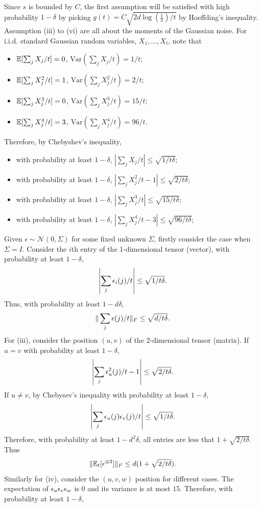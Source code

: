 Since $s$ is bounded by $C$, the first assumption will be satisfied with high probability $1-\delta$ by picking $g(t) = C\sqrt{2d\log(\frac{1}{\delta})/t}$ by Hoeffding's inequality. Assumption (iii) to (vi) are all about the moments of the Gaussian noise. 
For i.i.d. standard Gaussian random variables, $X_1, \ldots, X_t$, note that
\begin{itemize}
\item $ \mathbb{E}[\sum_j X_j/t] = 0$, $\text{Var}(\sum_j X_j/t) = 1/t$;
\item $ \mathbb{E}[\sum_j X_j^2/t] = 1$, $\text{Var}(\sum_j X_j^2/t) = 2/t$;
\item $ \mathbb{E}[\sum_j X_j^3/t] = 0$, $\text{Var}(\sum_j X_j^3/t) = 15/t$;
\item $ \mathbb{E}[\sum_j X_j^4/t] = 3$, $\text{Var}(\sum_j X_j^4/t) = 96/t$.
\end{itemize}
Therefore, by Chebyshev's inequality,
\begin{itemize}
\item with probability at least $1-\delta$, $|\sum_j X_j/t| \le \sqrt{1/t\delta}$;
\item with probability at least $1-\delta$, $|\sum_j X_j^2/t -1 | \le \sqrt{2/t\delta}$;
\item with probability at least $1-\delta$, $|\sum_j X_j^3/t| \le \sqrt{15/t\delta}$;
\item with probability at least $1-\delta$, $|\sum_j X_j^4/t -3| \le \sqrt{96/t\delta}$;
\end{itemize}
Given $\epsilon \sim \mathcal{N}(0,\Sigma)$ for some fixed unknown $\Sigma$, firstly consider the case when $\Sigma = I$.
Consider the $i$th entry of the 1-dimensional tensor (vector), with probability at least $1-\delta$, 
\[
\left| \sum_j \epsilon_i(j)/t \right| \le \sqrt{1/t\delta}.
\]
Thus, with probability at least $1-d\delta$,
\[
\| \sum_j \epsilon(j)/t \|_F \le \sqrt{d/t\delta}.
\]
For (iii), consider the position $(u,v)$ of the 2-dimensional tensor (matrix). If $u=v$ with probability at least $1-\delta$,
\[
	\left| \sum_j \epsilon_u^2(j)/t - 1\right| \le \sqrt{2/t\delta}.
\]
If $u\neq v$, by Chebysev's inequality with probability at least $1-\delta$,
\[
	\left| \sum_j \epsilon_u(j)\epsilon_v(j)/t \right| \le  \sqrt{1/t\delta}.
\]
Therefore, with probability at least $1-d^2\delta$, all entries are less that $1+\sqrt{2/t\delta}$. Thus 
\[
\|\mathbb{E}_t[\epsilon^{\otimes 2}]\|_F \le d(1+\sqrt{2/t\delta}).
\]
Similarly for (iv), consider the $(u,v,w)$ position for different cases. The expectation of $\epsilon_u\epsilon_v\epsilon_w$ is 0 and its variance is at most  $15$. Therefore, with probability at least $1-\delta$,
